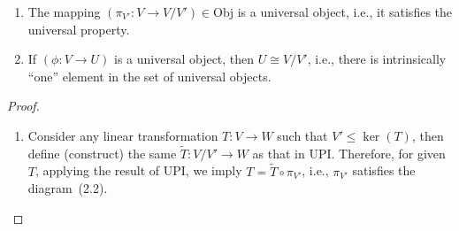 \begin{theorem}
\begin{enumerate}
\item
The mapping $(\pi_{V'}: V\to V/ V')\in\text{Obj}$ is a universal object, i.e., it satisfies the universal property.
\item
If $(\phi:V\to U)$ is a universal object, then $U\cong V/ V'$, i.e., 
there is intrinsically ``one'' element in the set of universal objects.
\end{enumerate}
\end{theorem}
\begin{proof}
\begin{enumerate}
\item
Consider any linear transformation $T:V\to W$ such that $V'\le\ker(T)$, 
then define (construct) the same $\tilde{T}:V/ V'\to W$ as that in UPI. 
Therefore, for given $T$, applying the result of UPI, we imply $T=\tilde{T}\circ\pi_{V'}$, i.e., $\pi_{V'}$ satisfies the diagram~(2.2).


\end{enumerate}
\end{proof}
